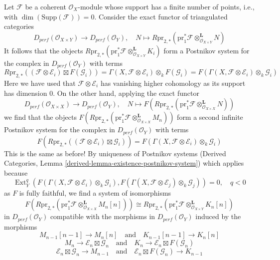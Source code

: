 \documentclass{stacks-project}
\theoremstyle{plain}
\theoremstyle{definition}
\theoremstyle{remark}
\numberwithin{equation}{subsection}
\def\Ext{\mathop{\mathrm{Ext}}\nolimits}
\begin{document}
\medskip\noindent
Let $\mathcal{F}$ be a coherent $\mathcal{O}_X$-module whose support
has a finite number of points, i.e., with $\dim(\text{Supp}(\mathcal{F})) = 0$.
Consider the exact functor of triangulated categories
$$
D_{perf}(\mathcal{O}_{X \times Y})
\longrightarrow
D_{perf}(\mathcal{O}_Y),\quad
N \longmapsto R\text{pr}_{2, *}(\text{pr}_1^*\mathcal{F}
\otimes^\mathbf{L}_{\mathcal{O}_{X \times Y}} N)
$$
It follows that the objects $R\text{pr}_{2, *}(\text{pr}_1^*\mathcal{F}
\otimes^\mathbf{L}_{\mathcal{O}_{X \times Y}} K_i)$
form a Postnikov system for the complex in
$D_{perf}(\mathcal{O}_Y)$ with terms
$$
R\text{pr}_{2, *}(
(\mathcal{F} \otimes \mathcal{E}_i) \boxtimes F(\mathcal{G}_i)) =
\Gamma(X, \mathcal{F} \otimes \mathcal{E}_i) \otimes_k F(\mathcal{G}_i) =
F(\Gamma(X, \mathcal{F} \otimes \mathcal{E}_i) \otimes_k \mathcal{G}_i)
$$
Here we have used that $\mathcal{F} \otimes \mathcal{E}_i$ has
vanishing higher cohomology as its support has dimension $0$.
On the other hand, applying the exact functor
$$
D_{perf}(\mathcal{O}_{X \times X})
\longrightarrow
D_{perf}(\mathcal{O}_Y),\quad
N \longmapsto F(R\text{pr}_{2, *}(\text{pr}_1^*\mathcal{F}
\otimes^\mathbf{L}_{\mathcal{O}_{X \times X}} N))
$$
we find that the objects
$F(R\text{pr}_{2, *}(\text{pr}_1^*\mathcal{F}
\otimes^\mathbf{L}_{\mathcal{O}_{X \times X}} M_n))$
form a second infinite Postnikov system
for the complex in $D_{perf}(\mathcal{O}_Y)$ with terms
$$
F(R\text{pr}_{2, *}(
(\mathcal{F} \otimes \mathcal{E}_i) \boxtimes \mathcal{G}_i)) =
F(\Gamma(X, \mathcal{F} \otimes \mathcal{E}_i) \otimes_k \mathcal{G}_i)
$$
This is the same as before! By uniqueness of Postnikov systems
(Derived Categories, Lemma \ref{derived-lemma-existence-postnikov-system})
which applies because
$$
\Ext^q_Y(
F(\Gamma(X, \mathcal{F} \otimes \mathcal{E}_i) \otimes_k \mathcal{G}_i),
F(\Gamma(X, \mathcal{F} \otimes \mathcal{E}_j) \otimes_k \mathcal{G}_j)) = 0,
\quad q < 0
$$
as $F$ is fully faithful, we find a system of isomorphisms
$$
F(R\text{pr}_{2, *}(\text{pr}_1^*\mathcal{F}
\otimes^\mathbf{L}_{\mathcal{O}_{X \times X}} M_n[n]))
\cong
R\text{pr}_{2, *}(\text{pr}_1^*\mathcal{F}
\otimes^\mathbf{L}_{\mathcal{O}_{X \times Y}} K_n[n])
$$
in $D_{perf}(\mathcal{O}_Y)$ compatible with the morphisms in
$D_{perf}(\mathcal{O}_Y)$ induced by the morphisms
$$
M_{n - 1}[n - 1] \to M_n[n]
\quad\text{and}\quad
K_{n - 1}[n - 1] \to K_n[n]
$$
$$
M_n \to \mathcal{E}_n \boxtimes \mathcal{G}_n
\quad\text{and}\quad
K_n \to \mathcal{E}_n \boxtimes F(\mathcal{G}_n)
$$
$$
\mathcal{E}_n \boxtimes \mathcal{G}_n \to M_{n - 1}
\quad\text{and}\quad
\mathcal{E}_n \boxtimes F(\mathcal{G}_n) \to K_{n - 1}
$$
\end{document}
